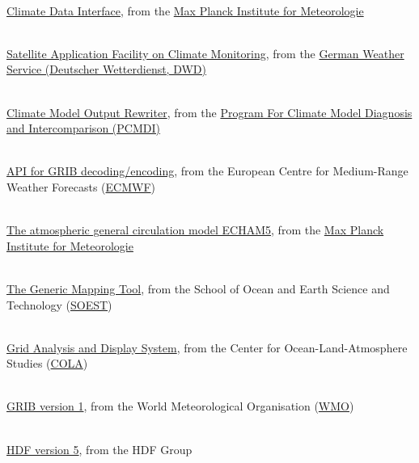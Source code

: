 \begin{thebibliography}{xx}


 \ \\
  \href{https://code.mpimet.mpg.de/projects/cdi}
       {Climate Data Interface},
  from the
  \href{http://www.mpimet.mpg.de}
       {Max Planck Institute for Meteorologie}


 \ \\
  \href{http://www.cmsaf.eu}
       {Satellite Application Facility on Climate Monitoring},
  from the
  \href{http://www.dwd.de}
       {German Weather Service (Deutscher Wetterdienst, DWD)}


 \ \\
  \href{git://github.com/PCMDI/cmor.git}
       {Climate Model Output Rewriter},
  from the
  \href{https://www-pcmdi.llnl.gov}
       { Program For Climate Model Diagnosis and Intercomparison (PCMDI)}


 \ \\
  \href{https://software.ecmwf.int/wiki/display/ECC/ecCodes+Home}
       {API for GRIB decoding/encoding},
  from the European Centre for Medium-Range Weather Forecasts
  (\href{http://www.ecmwf.int}{ECMWF})


 \ \\
  \href{http://www.mpimet.mpg.de/wissenschaft/publikationen/reports.html}
       {The atmospheric general circulation model ECHAM5},
  from the
  \href{http://www.mpimet.mpg.de}
       {Max Planck Institute for Meteorologie}


 \ \\
  \href{http://gmt.soest.hawaii.edu/gmt4/}
       {The Generic Mapping Tool},
  from the School of Ocean and Earth Science and Technology
  (\href{http://www.soest.hawaii.edu/}{SOEST})


 \ \\
  \href{http://www.iges.org/grads/}
       {Grid Analysis and Display System},
  from the Center for Ocean-Land-Atmosphere Studies
  (\href{http://www.iges.org/cola.html}{COLA})


 \ \\
  \href{http://www.wmo.ch/web/www/WMOCodes/Guides/GRIB/GRIB1-Contents.html}
       {GRIB version 1},
  from the World Meteorological Organisation
  (\href{http://www.wmo.ch}{WMO})


 \ \\
  \href{https://www.hdfgroup.org/HDF5}
       {HDF version 5},
  from the HDF Group



\end{thebibliography}

